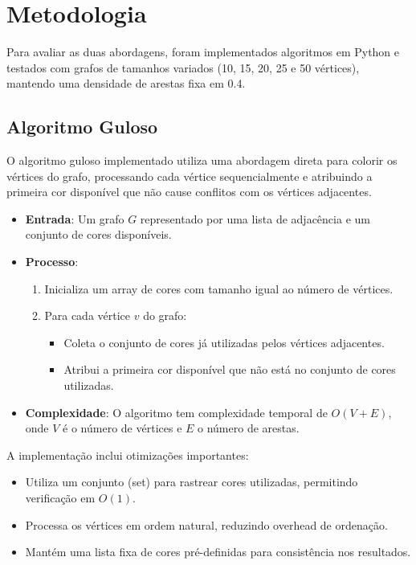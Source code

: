 \documentclass[12pt]{article}
\begin{document}
\section{Metodologia}

Para avaliar as duas abordagens, foram implementados algoritmos em Python e testados com grafos de tamanhos variados (10, 15, 20, 25 e 50 vértices), mantendo uma densidade de arestas fixa em 0.4.

\subsection{Algoritmo Guloso}

O algoritmo guloso implementado utiliza uma abordagem direta para colorir os vértices do grafo, processando cada vértice sequencialmente e atribuindo a primeira cor disponível que não cause conflitos com os vértices adjacentes.

\begin{itemize}
    \item \textbf{Entrada}: Um grafo \( G \) representado por uma lista de adjacência e um conjunto de cores disponíveis.
    \item \textbf{Processo}:
    \begin{enumerate}
        \item Inicializa um array de cores com tamanho igual ao número de vértices.
        \item Para cada vértice \( v \) do grafo:
        \begin{itemize}
            \item Coleta o conjunto de cores já utilizadas pelos vértices adjacentes.
            \item Atribui a primeira cor disponível que não está no conjunto de cores utilizadas.
        \end{itemize}
    \end{enumerate}
    \item \textbf{Complexidade}: O algoritmo tem complexidade temporal de \( O(V + E) \), onde \( V \) é o número de vértices e \( E \) o número de arestas.
\end{itemize}

A implementação inclui otimizações importantes:
\begin{itemize}
    \item Utiliza um conjunto (set) para rastrear cores utilizadas, permitindo verificação em \( O(1) \).
    \item Processa os vértices em ordem natural, reduzindo overhead de ordenação.
    \item Mantém uma lista fixa de cores pré-definidas para consistência nos resultados.
\end{itemize}
\end{document}
